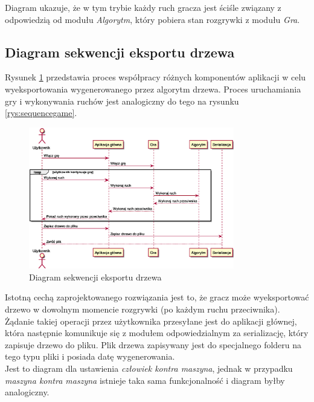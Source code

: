 \documentclass{article}
\newcommand{\modulename}[1]{\textit{#1}}
\begin{document}
	\noindent Diagram ukazuje, że w tym trybie każdy ruch gracza jest ściśle związany z odpowiedzią od modułu \modulename{Algorytm}, który pobiera stan rozgrywki z modułu \modulename{Gra}.
	
	\clearpage
	\subsection{Diagram sekwencji eksportu drzewa}
	Rysunek \ref{rys:sequenceserialize} przedstawia proces współpracy różnych komponentów aplikacji w celu wyeksportowania wygenerowanego przez algorytm drzewa. Proces uruchamiania gry i wykonywania ruchów jest analogiczny do tego na rysunku \ref{rys:sequencegame}. 
	\begin{figure}[h]
		\centering
		\includegraphics[width=0.8\textwidth]{serialize_sequence}
		\caption{Diagram sekwencji eksportu drzewa}
		\label{rys:sequenceserialize}
	\end{figure}

	\noindent Istotną cechą zaprojektowanego rozwiązania jest to, że gracz może wyeksportować drzewo w dowolnym momencie rozgrywki (po każdym ruchu przeciwnika). Żądanie takiej operacji przez użytkownika przesyłane jest do aplikacji głównej, która następnie komunikuje się z modułem odpowiedzialnym za serializację, który zapisuje drzewo do pliku. Plik drzewa zapisywany jest do specjalnego folderu na tego typu pliki i posiada datę wygenerowania.\\
	
	\noindent Jest to diagram dla ustawienia \modulename{człowiek kontra maszyna}, jednak w przypadku \modulename{maszyna kontra maszyna} istnieje taka sama funkcjonalność i diagram byłby analogiczny.
	
	\clearpage
\end{document}

